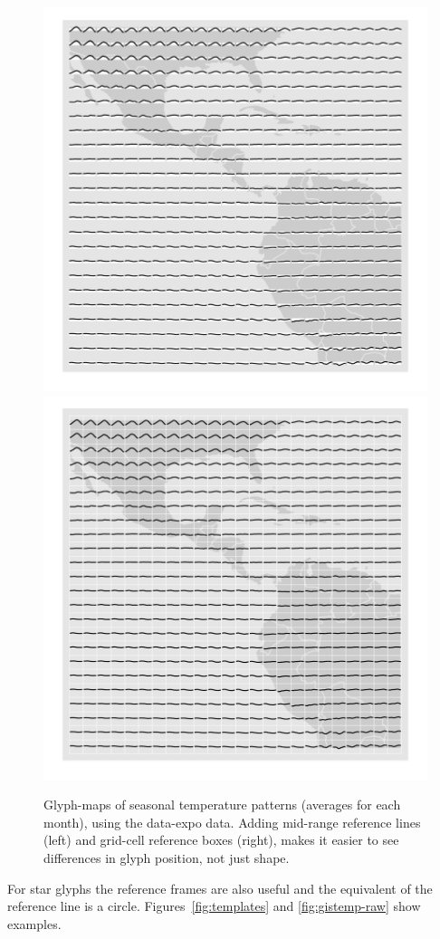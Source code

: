 \documentclass[oneside]{article}
\begin{document}


\begin{figure}[htbp]
  \centering
  \includegraphics[width=0.5\linewidth]{ref-line}%
  \includegraphics[width=0.5\linewidth]{ref-box}

  \caption{Glyph-maps of seasonal temperature patterns (averages for each month), using the data-expo data. Adding mid-range reference lines (left) and grid-cell reference boxes (right), makes it easier to see differences in glyph position, not just shape.}
  \label{fig:ref-basic}
\end{figure}

For star glyphs the reference frames are also useful and the equivalent of the reference line is a circle. Figures~\ref{fig:templates} and \ref{fig:gistemp-raw} show examples.
\end{document}
